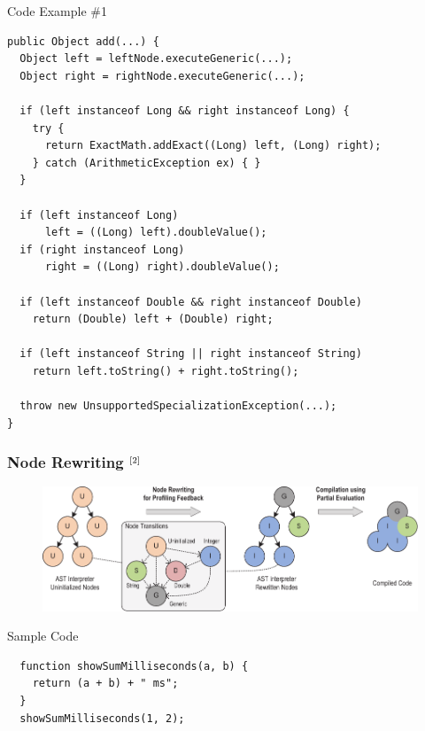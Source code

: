\documentclass[xcolor=dvipsname,handout]{beamer}
\newcommand{\up}[1]{\ensuremath{^{{\tiny#1}}}}
\begin{document}
\begin{frame}[fragile]{Code Example \#1}
\begin{lstlisting}
public Object add(...) {
  Object left = leftNode.executeGeneric(...);
  Object right = rightNode.executeGeneric(...);

  if (left instanceof Long && right instanceof Long) {
    try {
      return ExactMath.addExact((Long) left, (Long) right);
    } catch (ArithmeticException ex) { }
  }

  if (left instanceof Long)
      left = ((Long) left).doubleValue();
  if (right instanceof Long)
      right = ((Long) right).doubleValue();

  if (left instanceof Double && right instanceof Double)
    return (Double) left + (Double) right;

  if (left instanceof String || right instanceof String)
    return left.toString() + right.toString();

  throw new UnsupportedSpecializationException(...);
}
\end{lstlisting}
\end{frame}

\begin{frame}[fragile]
    \frametitle{Node Rewriting \up{[2]}}
	\begin{figure}
    	\includegraphics[width=\textwidth]{node_rewriting.pdf}
        \label{fig:node_rewriting}
    \end{figure}

    \begin{block}{Sample Code}
   	\begin{lstlisting}
  function showSumMilliseconds(a, b) {
    return (a + b) + " ms";
  }
  showSumMilliseconds(1, 2);
    \end{lstlisting}
    \end{block}
\end{frame}
\end{document}
